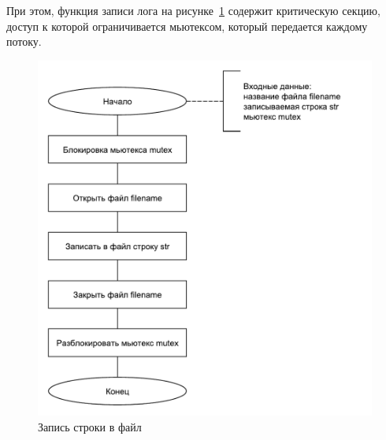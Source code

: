 \newpage
При этом, функция записи лога на рисунке~\ref{fig:log} содержит критическую секцию, доступ к которой ограничивается мьютексом, который передается каждому потоку.

\begin{figure}
	\centering
	\includegraphics[width=0.7\linewidth]{images/log.pdf}
	\caption[]{Запись строки в файл}
	\label{fig:log}
\end{figure}